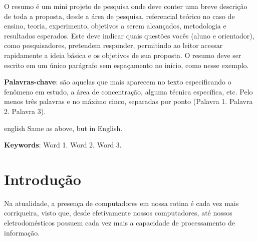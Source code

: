 \documentclass[12pt,oneside,brazil,hidelinks,article,sumario=tradicional,a4paper]{abntex2}
\renewcommand{\imprimircapa}{%
  \begin{capa}%
    \centering
    {\imprimirinstituicao\vfill}

    {\ABNTEXchapterfont\large\imprimirautor}

    \vfill
    {\ABNTEXchapterfont\bfseries\LARGE\imprimirtitulo}
    \vfill

    \large\imprimirlocal

    \large\imprimirdata

    \vspace*{15mm}
  \end{capa}
}
\begin{document}
\pretextual
\imprimircapa

\begin{resumo} %
  O resumo é um mini projeto de pesquisa onde deve conter uma breve descrição de toda a proposta, desde a área de pesquisa, referencial teórico no caso de ensino, teoria, experimento, objetivos a serem alcançados, metodologia e resultados esperados. Este deve indicar quais questões vocês (aluno e orientador), como pesquisadores, pretendem responder, permitindo ao leitor acessar rapidamente a ideia básica e os objetivos de sua proposta. O resumo deve ser escrito em um único parágrafo sem espaçamento no início, como nesse exemplo.
  \vspace{\onelineskip}

  \noindent
  \textbf{Palavras-chave}: são aquelas que mais aparecem no texto especificando o fenômeno em estudo, a área de concentração, alguma técnica específica, etc. Pelo menos três palavras e no máximo cinco, separadas por ponto (Palavra 1. Palavra 2. Palavra 3).
\end{resumo}

\begin{resumo}[Abstract] %
  \begin{otherlanguage*}{english}
    Same as above, but in English.
    \vspace{\onelineskip}

    \noindent
    \textbf{Keywords}: Word 1. Word 2. Word 3.
  \end{otherlanguage*}
\end{resumo}





\textual%

\section{Introdução}\label{sec:intro}

Na atualidade, a presença de computadores em nossa rotina é cada vez mais corriqueira, visto que, desde efetivamente nossos computadores, até nossos eletrodomésticos possuem cada vez mais a capacidade de processamento de informação.
\end{document}
